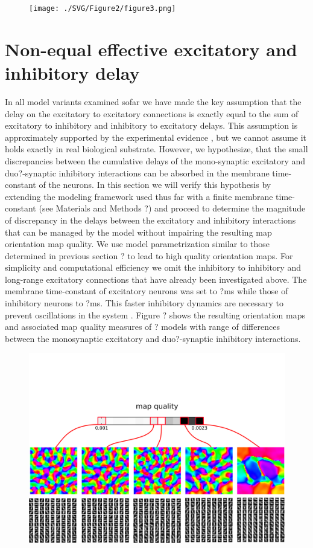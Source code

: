 \documentclass[a4paper,10pt]{article}
\begin{document}
\begin{figure}[htpb!] 
\centering
\texttt{[image: ./SVG/Figure2/figure3.png]}
\caption{}
\label{fig:figure3}
\end{figure} 

\section{Non-equal effective excitatory and inhibitory delay}

In all model variants examined sofar we have made the key assumption that the delay on the excitatory to excitatory connections is exactly equal 
to the sum of excitatory to inhibitory and inhibitory to excitatory delays. This assumption is approximately supported by the experimental evidence \cite{?}, 
but we cannot assume it holds exactly in real biological substrate.  However, we hypothesize, that the small discrepancies between the cumulative delays 
of the mono-synaptic excitatory and duo?-synaptic inhibitory interactions can be absorbed in the membrane time-constant of the neurons. In this section we will 
verify this hypothesis by extending the modeling framework used thus far with a finite membrane time-constant (see Materials and Methods ?) and proceed to determine 
the magnitude of discrepancy in the delays between the excitatory and inhibitory interactions that can be managed by the model without impairing the resulting map orientation 
map quality. We use model parametrization similar to those determined in previous section ? to lead to high quality orientation maps. For simplicity and computational 
efficiency we omit the inhibitory to inhibitory and long-range excitatory connections that have already been investigated above. The membrane time-constant of excitatory 
neurons was set to ?ms while those of inhibitory neurons to ?ms. This faster inhibitory dynamics are necessary to prevent oscillations in the system \cite{?}. 
Figure ? shows the resulting orientation maps and associated map quality measures of ? models with range of differences between the monosynaptic excitatory and 
duo?-synaptic inhibitory interactions. 
 
\begin{figure}[htpb!] 
\centering
\includegraphics[width=16cm]{./SVG/Figure4/figure4.png}
\caption{}
\label{fig:figure3}
\end{figure} 





\end{document}
